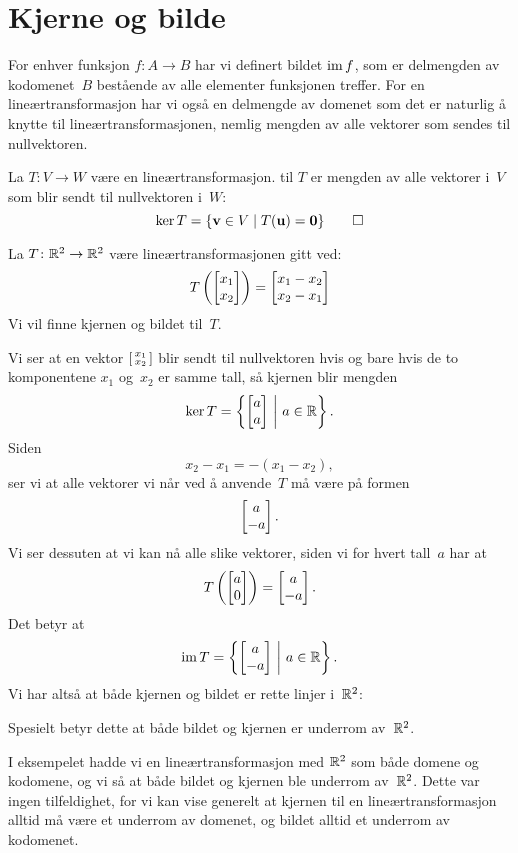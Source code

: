\section*{Kjerne og bilde}

For enhver funksjon $f \colon A \to B$ har vi definert bildet $\operatorname{im} f$,
som er delmengden av kodomenet~$B$ bestående av alle elementer
funksjonen treffer.  For en lineærtransformasjon har vi også en
delmengde av domenet som det er naturlig å knytte til
lineærtransformasjonen, nemlig mengden av alle vektorer som sendes til
nullvektoren.

\begin{defn}
La $T \colon V \to W$ være en lineærtransformasjon.  
til $T$ er mengden av alle vektorer i~$V$ som blir sendt til
nullvektoren i~$W$:
\[
\ker T = \{ \mathbf{v} \in V \mid T(\mathbf{u}) = \mathbf{0} \}\qedhere
\]
\end{defn}

\begin{ex}
La $T \colon \mathbb{R}^2 \to \mathbb{R}^2$ være lineærtransformasjonen gitt ved:
\[
T \left( \begin{bmatrix} x_1 \\ x_2 \end{bmatrix} \right) = \begin{bmatrix} x_1-x_2 \\ x_2-x_1 \end{bmatrix}
\]
Vi vil finne kjernen og bildet til~$T$.

Vi ser at en vektor $\left[ \begin{smallmatrix} x_1 \\ x_2 \end{smallmatrix} \right]$ blir sendt til nullvektoren hvis
og bare hvis de to komponentene $x_1$ og~$x_2$ er samme tall, så
kjernen blir mengden
\[
\ker T = \left\{ \begin{bmatrix} a \\ a \end{bmatrix}\ \middle|\ a \in \mathbb{R} \right\}.
\]
Siden
\[
x_2 - x_1 = - (x_1 - x_2),
\]
ser vi at alle vektorer vi når ved å anvende~$T$ må være på formen
\[
\begin{bmatrix} a \\ -a \end{bmatrix}.
\]
Vi ser dessuten at vi kan nå alle slike vektorer, siden vi for hvert
tall~$a$ har at
\[
T \left( \begin{bmatrix} a \\ 0 \end{bmatrix} \right) = \begin{bmatrix} a \\ -a \end{bmatrix}.
\]
Det betyr at
\[
\operatorname{im} T = \left\{ \begin{bmatrix} a \\ -a \end{bmatrix}\ \middle|\ a \in \mathbb{R} \right\}.
\]
Vi har altså at både kjernen og bildet er rette linjer i~$\mathbb{R}^2$:
\begin{center}
\end{center}
Spesielt betyr dette at både bildet og kjernen er underrom av~$\mathbb{R}^2$.
\end{ex}

I eksempelet hadde vi en lineærtransformasjon med $\mathbb{R}^2$ som både
domene og kodomene, og vi så at både bildet og kjernen ble underrom
av~$\mathbb{R}^2$.  Dette var ingen tilfeldighet, for vi kan vise generelt at
kjernen til en lineærtransformasjon alltid må være et underrom av
domenet, og bildet alltid et underrom av kodomenet.

